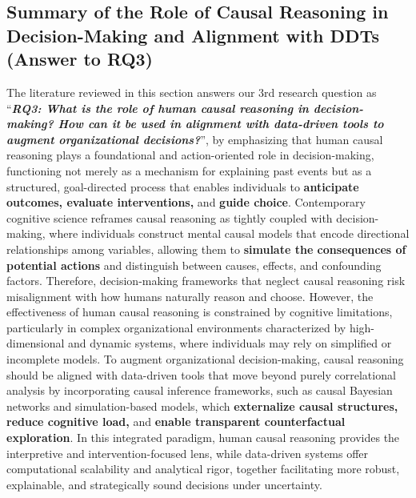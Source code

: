 \documentclass{sfuthesis}
\begin{document}
\subsection{Summary of the Role of Causal Reasoning in Decision-Making and Alignment with DDTs (Answer to RQ3)}
The literature reviewed in this section answers our 3rd research question as “\textit{\textbf{RQ3: What is the role of human causal reasoning in decision-making? How can it be used in alignment with data-driven tools to augment organizational decisions?}}”, by emphasizing that human causal reasoning plays a foundational and action-oriented role in decision-making, functioning not merely as a mechanism for explaining past events but as a structured, goal-directed process that enables individuals to \textbf{anticipate outcomes, evaluate interventions, }and\textbf{ guide choice}. Contemporary cognitive science reframes causal reasoning as tightly coupled with decision-making, where individuals construct mental causal models that encode directional relationships among variables, allowing them to \textbf{simulate the consequences of potential actions} and distinguish between causes, effects, and confounding factors. Therefore, decision-making frameworks that neglect causal reasoning risk misalignment with how humans naturally reason and choose. However, the effectiveness of human causal reasoning is constrained by cognitive limitations, particularly in complex organizational environments characterized by high-dimensional and dynamic systems, where individuals may rely on simplified or incomplete models. To augment organizational decision-making, causal reasoning should be aligned with data-driven tools that move beyond purely correlational analysis by incorporating causal inference frameworks, such as causal Bayesian networks and simulation-based models, which \textbf{externalize causal structures, reduce cognitive load, }and\textbf{ enable transparent counterfactual exploration}. In this integrated paradigm, human causal reasoning provides the interpretive and intervention-focused lens, while data-driven systems offer computational scalability and analytical rigor, together facilitating more robust, explainable, and strategically sound decisions under uncertainty.
\end{document}
